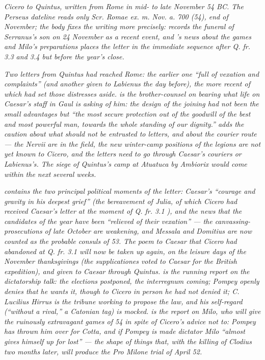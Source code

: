 
\textit{Cicero to Quintus, written from Rome in mid- to
late November 54 BC. The Perseus dateline reads only
\textit{Scr. Romae ex. m. Nov. a. 700 (54)}, end of November;
the body fixes the writing more precisely: 
records the funeral of Serranus's son on 24 November as a
recent event, and 's news about the games and
Milo's preparations places the letter in the immediate
sequence after Q. fr. 3.3 and 3.4 but before the year's
close.}

\textit{Two letters from Quintus had reached Rome: the earlier
one ``full of vexation and complaints'' (and another given to
Labienus the day before), the more recent of which had set
those distresses aside.  is the brother-counsel
on bearing what life on Caesar's staff in Gaul is asking of
him: the design of the joining had not been the small
advantages but ``the most secure protection out of the
goodwill of the best and most powerful man, towards the whole
standing of our dignity.''  adds the caution
about what should not be entrusted to letters, and about the
courier route --- the Nervii are in the field, the new
winter-camp positions of the legions are not yet known to
Cicero, and the letters need to go through Caesar's couriers
or Labienus's. The siege of Quintus's camp at Atuatuca by
Ambiorix would come within the next several weeks.}

\textit{ contains the two principal political
moments of the letter: Caesar's ``courage and gravity in his
deepest grief'' (the bereavement of Julia, of which Cicero
had received Caesar's letter at the moment of Q. fr. 3.1
), and the news that the candidates of the
year have been ``relieved of their vexation'' --- the
canvassing-prosecutions of late October are weakening, and
Messala and Domitius are now counted as the probable consuls
of 53. The poem to Caesar that Cicero had abandoned at
Q. fr. 3.1  will now be taken up again, on
the leisure days of the November thanksgivings (the
\textit{supplicationes} voted to Caesar for the British
expedition), and given to Caesar through Quintus.
 is the running report on the dictatorship
talk: the elections postponed, the interregnum coming;
Pompey openly denies that he wants it, though to Cicero in
person he had not denied it; C. Lucilius Hirrus is the
tribune working to propose the law, and his self-regard
(``without a rival,'' a Catonian tag) is mocked.  is the report on Milo, who will give the ruinously
extravagant games of 54 in spite of Cicero's advice not to:
Pompey has thrown him over for Cotta, and if Pompey is made
dictator Milo ``almost gives himself up for lost'' --- the
shape of things that, with the killing of Clodius two months
later, will produce the Pro Milone trial of April 52.}

